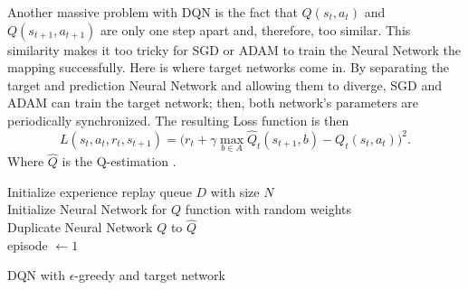 Another massive problem with DQN is the fact that $Q(s_t, a_t)$ and $Q(s_{t+1}, a_{t+1})$ are only one step apart and, therefore, too similar. This similarity makes it too tricky for SGD or ADAM to train the Neural Network the mapping successfully. Here is where target networks come in. By separating the target and prediction Neural Network and allowing them to diverge, SGD and ADAM can train the target network; then, both network's parameters are periodically synchronized. The resulting Loss function is then $$L(s_t, a_t, r_t, s_{t+1})=\big(r_t+\gamma\max_{b\in A} \hat{Q}_t(s_{t+1},b)-Q_t(s_t,a_t)\big)^2.$$ Where $\hat{Q}$ is the Q-estimation \cite{mnih_kavukcuoglu_silver_rusu_veness_bellemare_graves_riedmiller_fidjeland_ostrovski_et}.

\begin{algorithm}
	\SetAlgoLined
	\DontPrintSemicolon
	Initialize experience replay queue $D$ with size $N$ \\
	Initialize Neural Network for $Q$ function with random weights \\
	Duplicate Neural Network $Q$ to $\hat{Q}$ \\
	episode $\leftarrow 1$\\
	\caption{DQN with $\epsilon$-greedy and target network}\label{alg:dqn}
\end{algorithm}


